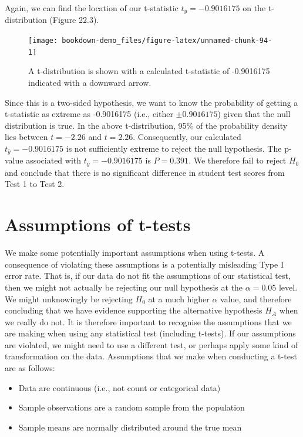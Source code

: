 \documentclass[
]{scrbook}
\providecommand{\tightlist}{%
  \setlength{\itemsep}{0pt}\setlength{\parskip}{0pt}}
\begin{document}
Again, we can find the location of our t-statistic \(t_{\bar{y}} = -0.9016175\) on the t-distribution (Figure 22.3).

\begin{figure}
\texttt{[image: bookdown-demo\_files/figure-latex/unnamed-chunk-94-1]} \caption{A t-distribution is shown with a calculated t-statistic of -0.9016175 indicated with a downward arrow.}\label{fig:unnamed-chunk-94}
\end{figure}

Since this is a two-sided hypothesis, we want to know the probability of getting a t-statistic as extreme as -0.9016175 (i.e., either \(\pm 0.9016175\)) given that the null distribution is true.
In the above t-distribution, 95\% of the probability density lies between \(t = -2.26\) and \(t = 2.26\).
Consequently, our calculated \(t_{\bar{y}} = -0.9016175\) is not sufficiently extreme to reject the null hypothesis.
The p-value associated with \(t_{\bar{y}} = -0.9016175\) is \(P = 0.391\).
We therefore fail to reject \(H_{0}\) and conclude that there is no significant difference in student test scores from Test 1 to Test 2.

\hypertarget{assumptions-of-t-tests}{%
\section{Assumptions of t-tests}\label{assumptions-of-t-tests}}

We make some potentially important assumptions when using t-tests.
A consequence of violating these assumptions is a potentially misleading Type I error rate.
That is, if our data do not fit the assumptions of our statistical test, then we might not actually be rejecting our null hypothesis at the \(\alpha = 0.05\) level.
We might unknowingly be rejecting \(H_{0}\) at a much higher \(\alpha\) value, and therefore concluding that we have evidence supporting the alternative hypothesis \(H_{A}\) when we really do not.
It is therefore important to recognise the assumptions that we are making when using any statistical test (including t-tests).
If our assumptions are violated, we might need to use a different test, or perhaps apply some kind of transformation on the data.
Assumptions that we make when conducting a t-test are as follows:

\begin{itemize}
\tightlist
\item
  Data are continuous (i.e., not count or categorical data)
\item
  Sample observations are a random sample from the population
\item
  Sample means are normally distributed around the true mean
\end{itemize}
\end{document}
